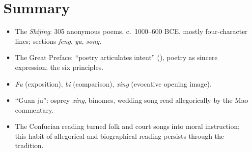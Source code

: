 \section*{Summary}
\begin{itemize}
  \item The \emph{Shijing}: 305 anonymous poems, c.\ 1000--600 BCE, mostly four-character
        lines; sections \emph{feng}, \emph{ya}, \emph{song}.
  \item The Great Preface: ``poetry articulates intent'' (), poetry as
        sincere expression; the six principles.
  \item \emph{Fu} (exposition), \emph{bi} (comparison), \emph{xing} (evocative opening
        image).
  \item ``Guan ju'': osprey \emph{xing}, binomes, wedding song read allegorically by the
        Mao commentary.
  \item The Confucian reading turned folk and court songs into moral instruction; this
        habit of allegorical and biographical reading persists through the tradition.
\end{itemize}
